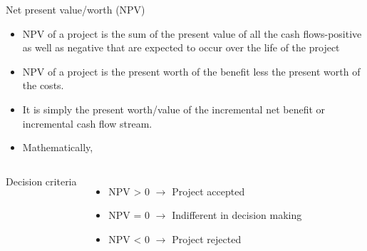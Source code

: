 \documentclass[12pt,ignorenonframetext,aspectratio=169]{beamer}
\providecommand{\tightlist}{%
  \setlength{\itemsep}{0pt}\setlength{\parskip}{0pt}}
\begin{document}
\begin{frame}{Net present value/worth (NPV)}
\protect\hypertarget{net-present-valueworth-npv}{}
\begin{itemize}
\tightlist
\item
  NPV of a project is the sum of the present value of all the cash
  flows-positive as well as negative that are expected to occur over the
  life of the project
\item
  NPV of a project is the present worth of the benefit less the present
  worth of the costs.
\item
  It is simply the present worth/value of the incremental net benefit or
  incremental cash flow stream.
\item
  Mathematically,
\end{itemize}

\begin{columns}
\footnotesize



Decision criteria

\begin{itemize}
\item NPV > 0 $\longrightarrow$ Project accepted
\item NPV = 0 $\longrightarrow$ Indifferent in decision making
\item NPV < 0 $\longrightarrow$ Project rejected
\end{itemize}

\end{columns}
\end{frame}
\end{document}

